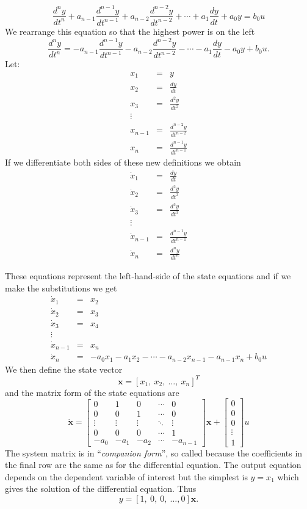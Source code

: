 \[
\frac{d^{n}y}{dt^{n}} +
a_{n-1}\frac{d^{n-1}y}{dt^{n-1}}+a_{n-2}\frac{d^{n-2}y}{dt^{n-2}}+\cdots+a_1\frac{dy}{dt}+a_0
y = b_0 u
\]
We rearrange this equation so that the highest power is on the
left
\[
\frac{d^{n}y}{dt^{n}} =
-a_{n-1}\frac{d^{n-1}y}{dt^{n-1}}-a_{n-2}\frac{d^{n-2}y}{dt^{n-2}}-\cdots-a_1\frac{dy}{dt}-a_0
y + b_0 u.
\]
Let:
\begin{eqnarray*}
x_1 &=& y \\ x_2 &=& \frac{dy}{dt} \\ x_3 & = & \frac{d^2y}{dt^2}
\\ \vdots \\ x_{n-1} &=& \frac{d^{n-2}y}{dt^{n-2}} \\ x_{n} &=& \frac{d^{n-1}y}{dt^{n-1}}
\end{eqnarray*}
If we differentiate both sides of these new definitions we obtain
\begin{eqnarray*}
\dot{x}_1 &=& \frac{dy}{dt} \\ \dot{x}_2 &=& \frac{d^2y}{dt^2} \\
\dot{x}_3 & = & \frac{d^3y}{dt^3}
\\ \vdots \\ \dot{x}_{n-1}  &=& \frac{d^{n-1}y}{dt^{n-1}} \\ \dot{x}_{n} &=& \frac{d^{n}y}{dt^{n}}
\end{eqnarray*}

These equations represent the left-hand-side of the state
equations and if we make the substitutions we get
\begin{eqnarray*}
\dot{x}_1 &=&
   x_2 \\ \dot{x}_2 &=&  x_3   \\
\dot{x}_3 & = &  x_4
\\ \vdots \\ \dot{x}_{n-1}  &=& x_n \\ \dot{x}_{n} &=&
-a_{0}x_1 -a_1x_2 - \cdots  -a_{n-2}x_{n-1} -a_{n-1}x_{n} + b_0 u
\end{eqnarray*}
We then define the state vector \[\mathbf{x}=[x_1,\ x_2,\ \ldots,\
x_n]^T\] and the matrix form of the state equations are
\[
\dot{\mathbf{x}} = \left[\begin{array}{ccccc}
  0 & 1 & 0 & \cdots & 0 \\
  0 & 0 & 1 & \cdots & 0 \\
  \vdots & \vdots & \vdots & \ddots & \vdots \\
  0 & 0 & 0 & \cdots & 1 \\
  -a_{0} & -a_{1} & -a_{2} & \cdots & -a_{n-1}
\end{array}\right]\mathbf{x}+\left[\begin{array}{c}
  0 \\
  0 \\
  0 \\
  \vdots \\
  1
\end{array}\right]u
\]
The system matrix is in ``\emph{companion form}'', so called because the
coefficients in the final row are the same as for the differential
equation. The output equation depends on the dependent variable of
interest but the simplest is $y=x_1$ which gives the solution of
the differential equation. Thus
\[y = [1,\ 0,\ 0,\ \ldots, 0] \mathbf{x}.\]

